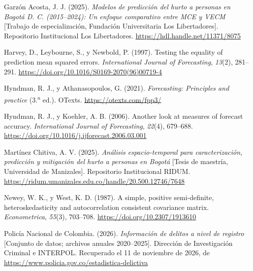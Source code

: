 \begin{thebibliography}{}
Garzón Acosta, J. J. (2025). \emph{Modelos de predicción del hurto a personas en Bogotá D. C. (2015--2024): Un enfoque comparativo entre MCE y VECM} [Trabajo de especialización, Fundación Universitaria Los Libertadores]. Repositorio Institucional Los Libertadores. \url{https://hdl.handle.net/11371/8075}

Harvey, D., Leybourne, S., y Newbold, P. (1997). Testing the equality of prediction mean squared errors. \emph{International Journal of Forecasting}, \emph{13}(2), 281--291. \url{https://doi.org/10.1016/S0169-2070(96)00719-4}

Hyndman, R. J., y Athanasopoulos, G. (2021). \emph{Forecasting: Principles and practice} (3.\textsuperscript{a} ed.). OTexts. \url{https://otexts.com/fpp3/}

Hyndman, R. J., y Koehler, A. B. (2006). Another look at measures of forecast accuracy. \emph{International Journal of Forecasting}, \emph{22}(4), 679--688. \url{https://doi.org/10.1016/j.ijforecast.2006.03.001}

Martínez Chitiva, A. V. (2025). \emph{Análisis espacio-temporal para caracterización, predicción y mitigación del hurto a personas en Bogotá} [Tesis de maestría, Universidad de Manizales]. Repositorio Institucional RIDUM. \url{https://ridum.umanizales.edu.co/handle/20.500.12746/7648}

Newey, W. K., y West, K. D. (1987). A simple, positive semi-definite, heteroskedasticity and autocorrelation consistent covariance matrix. \emph{Econometrica}, \emph{55}(3), 703--708. \url{https://doi.org/10.2307/1913610}

Policía Nacional de Colombia. (2026). \emph{Información de delitos a nivel de registro} [Conjunto de datos; archivos anuales 2020--2025]. Dirección de Investigación Criminal e INTERPOL. Recuperado el 11 de noviembre de 2026, de \url{https://www.policia.gov.co/estadistica-delictiva}


\end{thebibliography}
